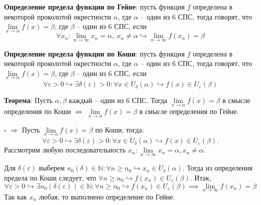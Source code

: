 \documentclass[12pt, a4paper, reqno]{article}
\begin{document}
    \textbf{Определение предела функции по Гейне}: пусть функция $f$ определена в некоторой
    проколотой окрестности $\alpha$, где $\alpha$ -- один из 6 СПС, тогда говорят, что
    $\lim\limits_{x\to\alpha} f(x) = \beta$, где $\beta$ -- один из 6 СПС, если
    \begin{equation*}
        \forall x_n: \lim\limits_{n\to\infty} x_n = \alpha, \>x_n \neq \alpha \hookrightarrow
        \lim\limits_{n\to\infty} f(x_n) = \beta
    \end{equation*}

    \textbf{Определение предела функции по Коши}: пусть функция $f$ определена в некоторой
    проколотой окрестности $\alpha$, где $\alpha$ -- один из 6 СПС, тогда говорят, что
    $\lim\limits_{x\to\alpha} f(x) = \beta$, где $\beta$ -- один из 6 СПС, если
    \begin{equation*}
        \forall\varepsilon > 0 \hookrightarrow \exists\delta(\varepsilon) > 0: \forall x\in
        \mathring U_{\delta}(\alpha) \hookrightarrow f(x)\in U_{\varepsilon}(\beta)
    \end{equation*}

    \textbf{Теорема}: Пусть $\alpha, \beta$ каждый -- один из 6 СПС. Тогда $\lim\limits_{x\to\alpha}
    f(x) = \beta$ в смысле определения по Коши $\iff$ $\lim\limits_{x\to\alpha} f(x) = \beta$ в
    смысле определения по Гейне.

    $\square$ $\boxed{\Rightarrow}$ Пусть $\lim\limits_{x\to\alpha} f(x) = \beta$ по Коши, тогда:
    \begin{equation*}
        \forall\varepsilon > 0 \hookrightarrow \exists\delta(\varepsilon) > 0: \forall x\in
        \mathring U_{\delta}(\alpha) \hookrightarrow f(x)\in U_{\varepsilon}(\beta).
    \end{equation*}
    Рассмотрим любую последовательность $x_n: \lim\limits_{n\to\infty} x_n = \alpha, x_n \neq
    \alpha$.

    Для $\delta(\varepsilon)$ выберем $n_0(\delta)\in\mathbb{N}: \forall n \geq n_0 \hookrightarrow
    x_n\in \mathring U_{\delta}(\alpha)$. Тогда из определения предела по Коши следует, что
    $\forall n \geq n_0 \hookrightarrow f(x_n)\in U_{\varepsilon}(\beta)$. Итак,
    \begin{equation*}
        \forall\varepsilon > 0 \hookrightarrow\exists n_0(\delta(\varepsilon))\in\mathbb{N}:
        \forall n \geq n_0 \hookrightarrow f(x_n)\in U_{\varepsilon}(\beta) \implies
        \lim\limits_{n\to\infty}f(x_n) = \beta
    \end{equation*}
    Так как $x_n$ любая, то выполнено определение по Гейне.
\end{document}
